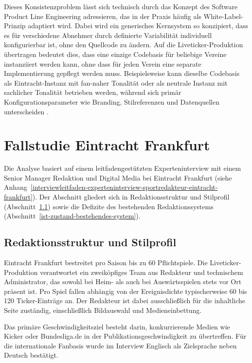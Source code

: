 Dieses Konsistenzproblem lässt sich technisch durch das Konzept des Software Product Line Engineering adressieren, das in der Praxis häufig als White-Label-Prinzip adaptiert wird. Dabei wird ein generisches Kernsystem so konzipiert, dass es für verschiedene Abnehmer durch definierte Variabilität individuell konfigurierbar ist, ohne den Quellcode zu ändern. Auf die Liveticker-Produktion übertragen bedeutet dies, dass eine einzige Codebasis für beliebige Vereine instanziiert werden kann, ohne dass für jeden Verein eine separate Implementierung gepflegt werden muss. Beispielsweise kann dieselbe Codebasis als Eintracht-Instanz mit fan-naher Tonalität oder als neutrale Instanz mit sachlicher Tonalität betrieben werden, während sich primär Konfigurationsparameter wie Branding, Stilreferenzen und Datenquellen unterscheiden \cite{pohl2005}.


\section{Fallstudie Eintracht Frankfurt}\label{anforderungsanalyse-am-beispiel-eintracht-frankfurt}

Die Analyse basiert auf einem leitfadengestützten Experteninterview mit einem Senior Manager Redaktion und Digital Media bei Eintracht Frankfurt (siehe Anhang~\ref{interviewleitfaden-experteninterview-sportredakteur-eintracht-frankfurt}). Der Abschnitt gliedert sich in Redaktionsstruktur und Stilprofil (Abschnitt~\ref{fallstudie-eintracht-frankfurt}) sowie die Defizite des bestehenden Redaktionssystems (Abschnitt~\ref{ist-zustand-bestehendes-system}).

\subsection{Redaktionsstruktur und Stilprofil}\label{fallstudie-eintracht-frankfurt}

Eintracht Frankfurt bestreitet pro Saison bis zu 60 Pflichtspiele. Die Liveticker-Produktion verantwortet ein zweiköpfiges Team aus Redakteur und technischem Administrator, das sowohl bei Heim- als auch bei Auswärtsspielen stets vor Ort präsent ist. Pro Spiel fallen abhängig von der Ereignisdichte typischerweise 60 bis 120 Ticker-Einträge an. Der Redakteur ist dabei ausschließlich für die inhaltliche Seite zuständig, einschließlich Bildauswahl und Medieneinbettung.

Das primäre Geschwindigkeitsziel besteht darin, konkurrierende Medien wie Kicker oder Bundesliga.de in der Publikationsgeschwindigkeit zu übertreffen. Für die internationale Fanbasis wurde im Interview Englisch als Zielsprache neben Deutsch bestätigt.

